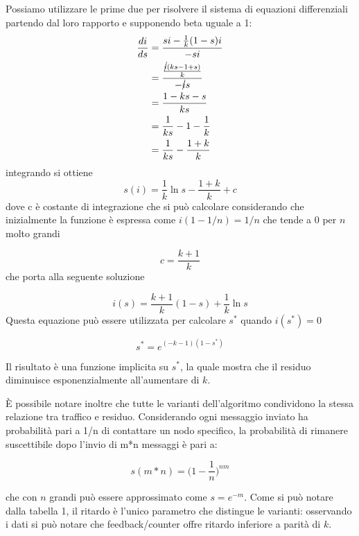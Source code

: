 Possiamo utilizzare le prime due per risolvere il sistema di equazioni differenziali partendo dal loro rapporto e supponendo beta uguale a 1:
\begin{equation}
    \begin{split}
        \frac{di}{ds}   & =  \frac{si - \frac{1}{k} (1-s) i}{-si} \\
        & = \frac{\frac{\cancel{i} (ks - 1 + s)}{k}}{- \cancel{i}s} \\
        & = \frac{1-ks-s}{ks} \\
        & = \frac{1}{ks} - 1 - \frac{1}{k} \\
        & = \frac{1}{ks} - \frac{1+k}{k} 
    \end{split}
\end{equation}
integrando si ottiene
\begin{equation}
    s(i) = \frac{1}{k} \ln s - \frac{1+k}{k} + c
\end{equation}
dove c è costante di integrazione che si può calcolare considerando che inizialmente la funzione è espressa come $i(1-1/n) = 1/n$ che tende a $0$ per $n$ molto grandi

\begin{equation}
    c = \frac{k+1}{k}
\end{equation}
che porta alla seguente soluzione

\begin{equation}
    i(s) = \frac{k+1}{k}(1-s) + \frac{1}{k} \ln s
\end{equation}
Questa equazione può essere utilizzata per calcolare $s^*$ quando $i(s^*) = 0$

\begin{equation}
    s^* = e^{(-k-1)(1-s^*)}
\end{equation}

Il risultato è una funzione implicita su $s^*$, la quale mostra che il residuo diminuisce esponenzialmente all'aumentare di $k$.

È possibile notare inoltre che tutte le varianti dell’algoritmo condividono la stessa relazione tra traffico e residuo. Considerando ogni messaggio inviato ha probabilità pari a 1/n di contattare un nodo specifico, la probabilità di rimanere suscettibile dopo l’invio di m*n messaggi è pari a:

\begin{equation}
    s(m*n) = \Big(1-\frac{1}{n}\Big)^{nm}
\end{equation}

che con $n$ grandi può essere approssimato come $s = e^{-m}$.
Come si può notare dalla tabella 1, il ritardo è l’unico parametro che distingue le varianti: osservando i dati si può notare che feedback/counter offre ritardo inferiore a parità di $k$.




